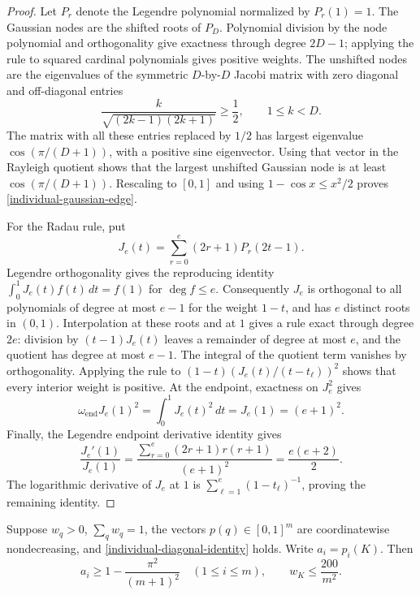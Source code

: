\begin{proof}
Let \(P_r\) denote the Legendre polynomial normalized by \(P_r(1)=1\).
The Gaussian nodes are the shifted roots of \(P_D\).  Polynomial
division by the node polynomial and orthogonality give exactness through
degree \(2D-1\); applying the rule to squared cardinal polynomials gives
positive weights.  The unshifted nodes are the eigenvalues of the
symmetric \(D\)-by-\(D\) Jacobi matrix with zero diagonal and
off-diagonal entries
\[
  \frac{k}{\sqrt{(2k-1)(2k+1)}}\geq\frac12,
  \qquad 1\leq k<D.
\]
The matrix with all these entries replaced by \(1/2\) has largest
eigenvalue \(\cos(\pi/(D+1))\), with a positive sine eigenvector.
Using that vector in the Rayleigh quotient shows that the largest
unshifted Gaussian node is at least \(\cos(\pi/(D+1))\).  Rescaling to
\([0,1]\) and using \(1-\cos x\leq x^2/2\) proves
\eqref{individual-gaussian-edge}.

For the Radau rule, put
\[
  J_e(t)=\sum_{r=0}^e(2r+1)P_r(2t-1).
\]
Legendre orthogonality gives the reproducing identity
\(\int_0^1J_e(t)f(t)\,dt=f(1)\) for \(\deg f\leq e\).
Consequently \(J_e\) is orthogonal to all polynomials of degree at most
\(e-1\) for the weight \(1-t\), and has \(e\) distinct roots in
\((0,1)\).  Interpolation at these roots and at \(1\) gives a rule
exact through degree \(2e\): division by \((t-1)J_e(t)\) leaves a
remainder of degree at most \(e\), and the quotient has degree at most
\(e-1\).  The integral of the quotient term vanishes by orthogonality.
Applying the rule to
\((1-t)(J_e(t)/(t-t_\ell))^2\) shows that every interior weight is
positive.  At the endpoint, exactness on \(J_e^2\) gives
\[
  \omega_{\mathrm{end}}J_e(1)^2
  =\int_0^1J_e(t)^2\,dt=J_e(1)=(e+1)^2.
\]
Finally, the Legendre endpoint derivative identity gives
\[
  \frac{J_e'(1)}{J_e(1)}
  =\frac{\sum_{r=0}^e(2r+1)r(r+1)}{(e+1)^2}
  =\frac{e(e+2)}2.
\]
The logarithmic derivative of \(J_e\) at \(1\) is
\(\sum_{\ell=1}^e(1-t_\ell)^{-1}\), proving the remaining identity.
\end{proof}

\begin{lemma}\label{individual-last-row}
Suppose \(w_q>0\), \(\sum_qw_q=1\), the vectors \(p(q)\in[0,1]^m\)
are coordinatewise nondecreasing, and
\eqref{individual-diagonal-identity} holds.  Write \(a_i=p_i(K)\).
Then
\[
  a_i\geq1-\frac{\pi^2}{(m+1)^2}\quad(1\leq i\leq m),
  \qquad w_K\leq\frac{200}{m^2}.
\]
\end{lemma}


